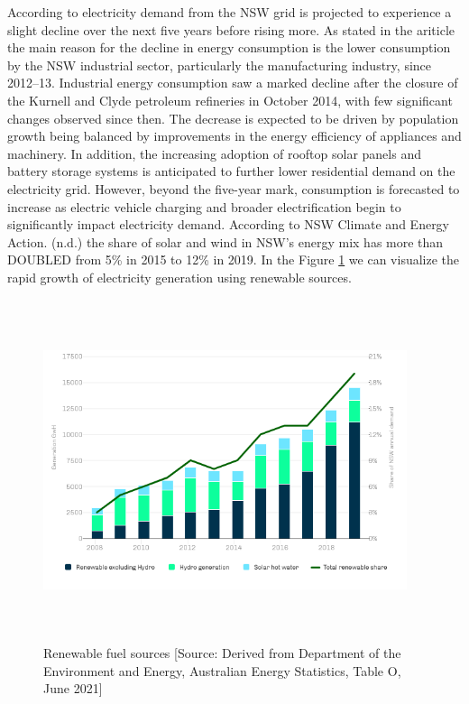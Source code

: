 \documentclass[mstat,12pt]{unswthesis}
\begin{document}
According to \cite{nsw_epa_2021_energy_consumption} electricity demand
from the NSW grid is projected to experience a slight decline over the
next five years before rising more. As stated in the ariticle the main
reason for the decline in energy consumption is the lower consumption by
the NSW industrial sector, particularly the manufacturing industry,
since 2012--13. Industrial energy consumption saw a marked decline after
the closure of the Kurnell and Clyde petroleum refineries in October
2014, with few significant changes observed since then. The decrease is
expected to be driven by population growth being balanced by
improvements in the energy efficiency of appliances and machinery. In
addition, the increasing adoption of rooftop solar panels and battery
storage systems is anticipated to further lower residential demand on
the electricity grid. However, beyond the five-year mark, consumption is
forecasted to increase as electric vehicle charging and broader
electrification begin to significantly impact electricity demand.
According to NSW Climate and Energy Action. (n.d.) the share of solar
and wind in NSW's energy mix has more than DOUBLED from 5\% in 2015 to
12\% in 2019. In the Figure \ref{renewable} we can visualize the rapid
growth of electricity generation using renewable sources.

\begin{figure}[H]
\centering
\includegraphics[width=0.95\textwidth,height=10cm]{renewable_fuel_sources_chart.png}
\caption{Renewable fuel sources [Source:
Derived from Department of the Environment and Energy, Australian Energy Statistics, Table O, June 2021]}\label{renewable}
\end{figure}
\end{document}
